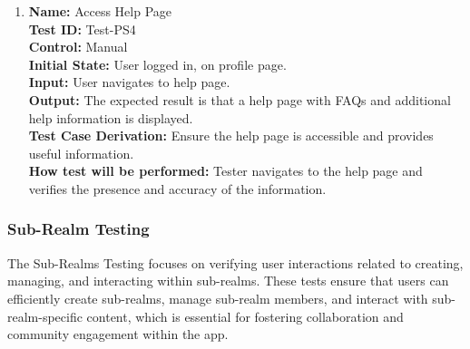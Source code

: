 \documentclass[12pt, titlepage]{article}
\begin{document}
\begin{enumerate}
  \item \textbf{Name:} {Access Help Page} \label{itm:Test-PS4}\\
        \textbf{Test ID:} Test-PS4\\
        \textbf{Control:} Manual \\
        \textbf{Initial State:} User logged in, on profile page. \\
        \textbf{Input:} User navigates to help page. \\
        \textbf{Output:} The expected result is that a help page with FAQs and additional help information is displayed. \\
        \textbf{Test Case Derivation:} Ensure the help page is accessible and provides useful information. \\
        \textbf{How test will be performed:} Tester navigates to the help page and verifies the presence and accuracy of the information.
\end{enumerate}

\subsubsection{Sub-Realm Testing}
\label{sec:sub-realms_testing}

The Sub-Realms Testing focuses on verifying user interactions related to creating, managing, and interacting within sub-realms. These tests ensure that users can efficiently create sub-realms, manage sub-realm members, and interact with sub-realm-specific content, which is essential for fostering collaboration and community engagement within the app.
\end{document}
